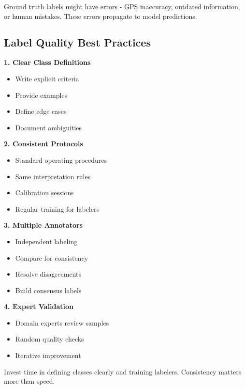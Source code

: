 \documentclass[
  letterpaper,
  DIV=11,
  numbers=noendperiod]{scrartcl}
\providecommand{\tightlist}{%
  \setlength{\itemsep}{0pt}\setlength{\parskip}{0pt}}
\begin{document}
Ground truth labels might have errors - GPS inaccuracy, outdated
information, or human mistakes. These errors propagate to model
predictions.

\subsection{Label Quality Best
Practices}\label{label-quality-best-practices}

\textbf{1. Clear Class Definitions}

\begin{itemize}
\tightlist
\item
  Write explicit criteria
\item
  Provide examples
\item
  Define edge cases
\item
  Document ambiguities
\end{itemize}

\textbf{2. Consistent Protocols}

\begin{itemize}
\tightlist
\item
  Standard operating procedures
\item
  Same interpretation rules
\item
  Calibration sessions
\item
  Regular training for labelers
\end{itemize}

\textbf{3. Multiple Annotators}

\begin{itemize}
\tightlist
\item
  Independent labeling
\item
  Compare for consistency
\item
  Resolve disagreements
\item
  Build consensus labels
\end{itemize}

\textbf{4. Expert Validation}

\begin{itemize}
\tightlist
\item
  Domain experts review samples
\item
  Random quality checks
\item
  Iterative improvement
\end{itemize}

Invest time in defining classes clearly and training labelers.
Consistency matters more than speed.
\end{document}
